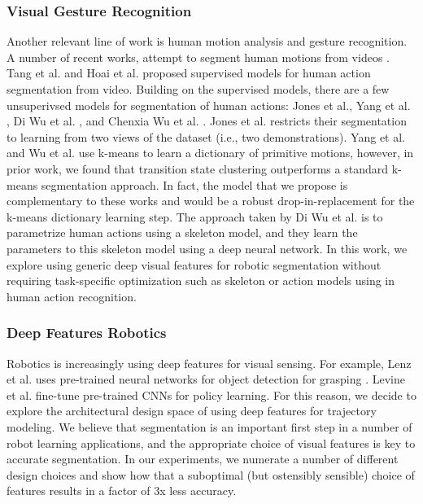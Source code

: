 \subsubsection{Visual Gesture Recognition}
Another relevant line of work is human motion analysis and gesture recognition.
A number of recent works, attempt to segment human motions from videos \cite{hoai2011joint, tang2012learning, yang2013discovering, jones2014unsupervised, wu2014leveraging, wu2015watch}.
Tang et al. and Hoai et al. proposed supervised models for human action segmentation from video.
Building on the supervised models, there are a few unsuperivsed models for segmentation of human actions: Jones et al.\cite{jones2014unsupervised}, Yang et al. \cite{yang2013discovering}, Di Wu et al. \cite{wu2014leveraging} , and Chenxia Wu et al. \cite{wu2015watch}.
Jones et al. \cite{jones2014unsupervised} restricts their segmentation to learning from two views of the dataset (i.e., two demonstrations).
Yang et al. \cite{yang2013discovering} and Wu et al.  \cite{wu2015watch} use k-means to learn a dictionary of primitive motions, however, in prior work, we found that transition state clustering outperforms a standard k-means segmentation approach.
In fact, the model that we propose is complementary to these works and would be a robust drop-in-replacement for the k-means dictionary learning step.
The approach taken by Di Wu et al. is to parametrize human actions using a skeleton model, and they learn the parameters to this skeleton model using a deep neural network.
In this work, we explore using generic deep visual features for robotic segmentation without requiring task-specific optimization such as skeleton or action models using in human action recognition.

\subsubsection{Deep Features Robotics}
Robotics is increasingly using deep features for visual sensing. For example, Lenz et al. uses pre-trained neural networks for object detection for grasping \cite{lenz2015deep}.
Levine et al. \cite{levine2015end} fine-tune pre-trained CNNs for policy learning.
For this reason, we decide to explore the architectural design space of using deep features for trajectory modeling.
We believe that segmentation is an important first step in a number of robot learning applications, and the appropriate choice of visual features is key to accurate segmentation.
In our experiments, we numerate a number of different design choices and show how that a suboptimal (but ostensibly sensible) choice of features results in a factor of 3x less accuracy.

